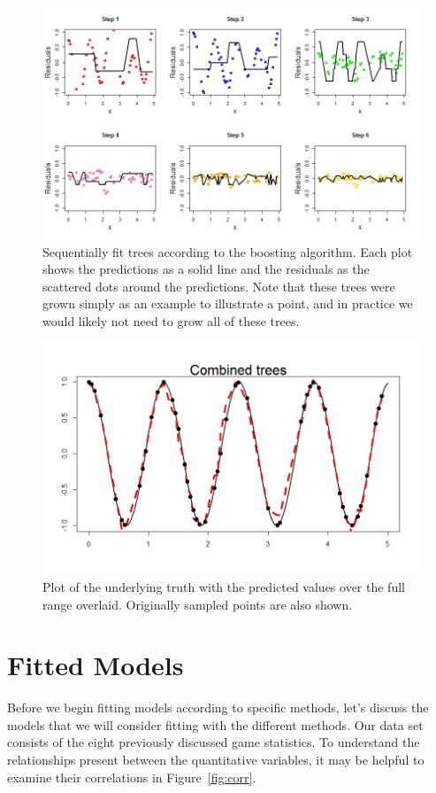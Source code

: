 \documentclass[12pt]{article}\usepackage[]{graphicx}\usepackage[]{color}
\begin{document}
\begin{figure}[h]
	\centering
	\includegraphics[width=.8\textwidth]{boostex.jpeg}
	\captionsetup{font=footnotesize,labelfont=footnotesize}
	\caption{\label{fig:boostex} Sequentially fit trees according to the boosting algorithm. Each plot shows the predictions as a solid line and the residuals as the scattered dots around the predictions. Note that these trees were grown simply as an example to illustrate a point, and in practice we would likely not need to grow all of these trees.}
\end{figure}

\begin{figure}[h]
	\centering
	\includegraphics[width=.8\textwidth]{combine.jpeg}
	\captionsetup{font=footnotesize,labelfont=footnotesize}
	\caption{\label{fig:combine} Plot of the underlying truth with the predicted values over the full range overlaid. Originally sampled points are also shown.}
\end{figure}

\newpage
\section{Fitted Models}
Before we begin fitting models according to specific methods, let's discuss the models that we will consider fitting with the different methods. Our data set consists of the eight previously discussed game statistics. To understand the relationships present between the quantitative variables, it may be helpful to examine their correlations in Figure~\ref{fig:corr}.
\end{document}
